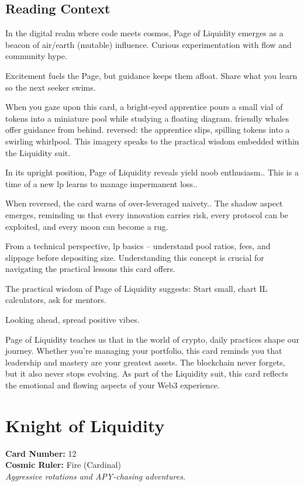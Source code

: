 \documentclass[11pt,oneside]{book}
\begin{document}
\begin{minipage}[t]{0.55\textwidth}
  \subsection*{Reading Context}
  In the digital realm where code meets cosmos, Page of Liquidity emerges as a beacon of air/earth (mutable) influence. Curious experimentation with flow and community hype.

  Excitement fuels the Page, but guidance keeps them afloat. Share what you learn so the next seeker swims.

  When you gaze upon this card, a bright-eyed apprentice pours a small vial of tokens into a miniature pool while studying a floating diagram. friendly whales offer guidance from behind. reversed: the apprentice slips, spilling tokens into a swirling whirlpool. This imagery speaks to the practical wisdom embedded within the Liquidity suit.

  In its upright position, Page of Liquidity reveals yield noob enthusiasm.. This is a time of a new lp learns to manage impermanent loss..

  When reversed, the card warns of over-leveraged naivety.. The shadow aspect emerges, reminding us that every innovation carries risk, every protocol can be exploited, and every moon can become a rug.

  From a technical perspective, lp basics – understand pool ratios, fees, and slippage before depositing size. Understanding this concept is crucial for navigating the practical lessons this card offers.

  The practical wisdom of Page of Liquidity suggests: Start small, chart IL calculators, ask for mentors.

  Looking ahead, spread positive vibes.

  Page of Liquidity teaches us that in the world of crypto, daily practices shape our journey. Whether you're managing your portfolio, this card reminds you that leadership and mastery are your greatest assets. The blockchain never forgets, but it also never stops evolving. As part of the Liquidity suit, this card reflects the emotional and flowing aspects of your Web3 experience.

\end{minipage}

\newpage
\section*{Knight of Liquidity}

\begin{minipage}[t]{0.55\textwidth}
  \vspace{0pt}
  \textbf{Card Number:} 12\\  \textbf{Cosmic Ruler:} Fire (Cardinal)\\  \textit{Aggressive rotations and APY-chasing adventures.}
\end{minipage}
\end{document}
